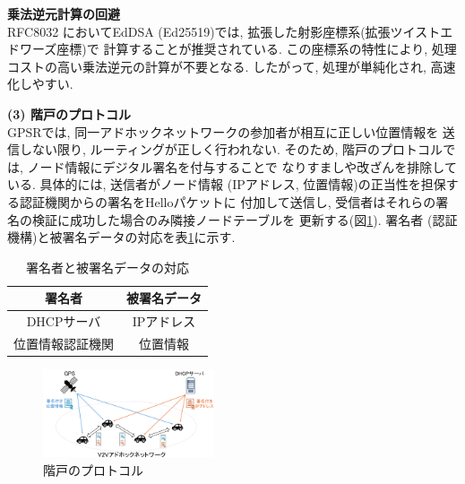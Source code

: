 \documentclass[a4j,9pt,twocolumn]{jsarticle}
\begin{document}
\smallskip
\begin{description}[labelwidth=3mm, labelsep=2mm]
    \item[(iii)] \textbf{乗法逆元計算の回避}\\
    RFC8032 \cite{8032}においてEdDSA (Ed25519)では, 拡張した射影座標系(拡張ツイストエドワーズ座標)で
    計算することが推奨されている.
    この座標系の特性により, 処理コストの高い乗法逆元の計算が不要となる.
    したがって, 処理が単純化され,  高速化しやすい. 
\end{description}

\newpage
\noindent\textbf{(3) 階戸のプロトコル}\\
\indent GPSRでは, 同一アドホックネットワークの参加者が相互に正しい位置情報を
送信しない限り, ルーティングが正しく行われない. そのため, 
階戸のプロトコル\cite{shinato}では, ノード情報にデジタル署名を付与することで
なりすましや改ざんを排除している. 具体的には, 送信者がノード情報 
(IPアドレス, 位置情報)の正当性を担保する認証機関からの署名をHelloパケットに
付加して送信し, 受信者はそれらの署名の検証に成功した場合のみ隣接ノードテーブルを
更新する(図\ref{fig:introduce}). 
署名者 (認証機構)と被署名データの対応を表\ref{tab:sign}に示す. 
\vspace{-3mm}
\begin{table}[h]
    \centering
    \caption{署名者と被署名データの対応\cite{shinato}}
    \label{tab:sign}
    \begin{tabular}{cc} \hline
        署名者 & 被署名データ \\ \hline \hline
        DHCPサーバ & IPアドレス \\
        位置情報認証機関 & 位置情報 \\ \hline
    \end{tabular}
\end{table}
\vspace{-5mm} %
\begin{figure}[h]
    \centering
    \includegraphics[width=0.45\textwidth]{figures/introduce.png}
    \caption{階戸のプロトコル\cite{shinato}}
    \label{fig:introduce}
\end{figure}
\vspace{-5mm}
\end{document}
